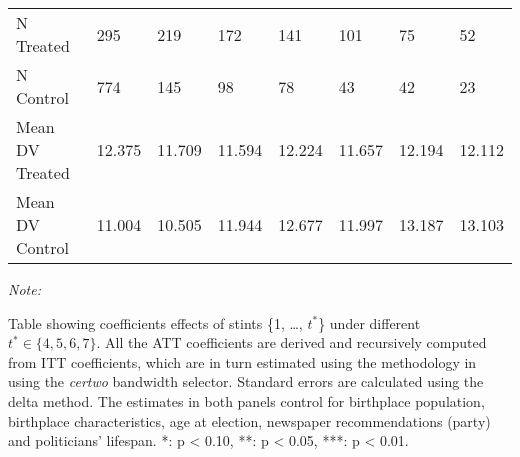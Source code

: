 \begin{table}[!h]
\begin{threeparttable}
\begin{tabular}[t]{llllllll}
\hspace{1em}N Treated & 295 & 219 & 172 & 141 & 101 & 75 & 52\\
\hspace{1em}N Control & 774 & 145 & 98 & 78 & 43 & 42 & 23\\
\hspace{1em}Mean DV Treated & 12.375 & 11.709 & 11.594 & 12.224 & 11.657 & 12.194 & 12.112\\
\hspace{1em}Mean DV Control & 11.004 & 10.505 & 11.944 & 12.677 & 11.997 & 13.187 & 13.103\\
\bottomrule
\end{tabular}
\begin{tablenotes}[para]
\item \textit{Note: } 
\item Table showing coefficients effects of stints \{1, \dots, $t^*$\} under different $t^* \in \{4,5,6,7\}$. All the ATT coefficients are derived and recursively computed from ITT coefficients, which are in turn estimated using the methodology in \citep{cattaneo2019practical} using the \textit{certwo} bandwidth selector. Standard errors are calculated using the delta method. The estimates in both panels control for birthplace population, birthplace characteristics, age at election, newspaper recommendations (party) and politicians' lifespan. *: p < 0.10, **: p < 0.05, ***: p < 0.01. 
\end{tablenotes}
\end{threeparttable}
\end{table}

